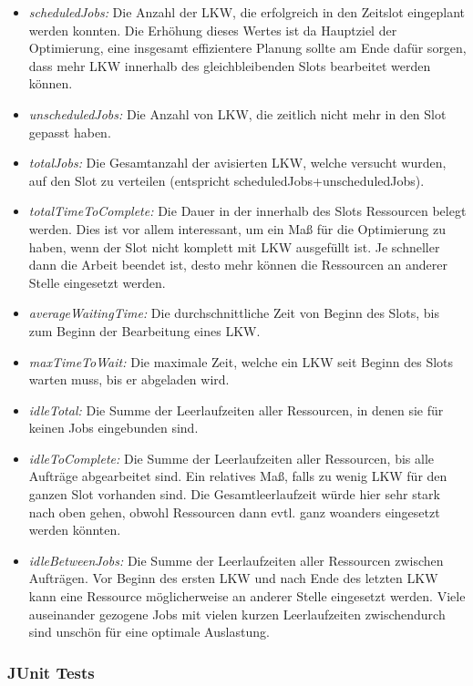 \begin{itemize}
    \item \textit{scheduledJobs:} Die Anzahl der LKW, die erfolgreich in den Zeitslot eingeplant werden konnten. Die Erhöhung dieses Wertes ist da Hauptziel der Optimierung, eine insgesamt effizientere Planung sollte am Ende dafür sorgen, dass mehr LKW innerhalb des gleichbleibenden Slots bearbeitet werden können.
    \item \textit{unscheduledJobs:} Die Anzahl von LKW, die zeitlich nicht mehr in den Slot gepasst haben.
    \item \textit{totalJobs:} Die Gesamtanzahl der avisierten LKW, welche versucht wurden, auf den Slot zu verteilen (entspricht scheduledJobs+unscheduledJobs).
    \item \textit{totalTimeToComplete:} Die Dauer in der innerhalb des Slots Ressourcen belegt werden. Dies ist vor allem interessant, um ein Maß für die Optimierung zu haben, wenn der Slot nicht komplett mit LKW ausgefüllt ist. Je schneller dann die Arbeit beendet ist, desto mehr können die Ressourcen an anderer Stelle eingesetzt werden.
    \item \textit{averageWaitingTime:} Die durchschnittliche Zeit von Beginn des Slots, bis zum Beginn der Bearbeitung eines LKW. 
    \item \textit{maxTimeToWait:} Die maximale Zeit, welche ein LKW seit Beginn des Slots warten muss, bis er abgeladen wird.
    \item \textit{idleTotal:} Die Summe der Leerlaufzeiten aller Ressourcen, in denen sie für keinen Jobs eingebunden sind.
    \item \textit{idleToComplete:} Die Summe der Leerlaufzeiten aller Ressourcen, bis alle Aufträge abgearbeitet sind. Ein relatives Maß, falls zu wenig LKW für den ganzen Slot vorhanden sind. Die Gesamtleerlaufzeit würde hier sehr stark nach oben gehen, obwohl Ressourcen dann evtl. ganz woanders eingesetzt werden könnten.
    \item \textit{idleBetweenJobs:} Die Summe der Leerlaufzeiten aller Ressourcen zwischen Aufträgen. Vor Beginn des ersten LKW und nach Ende des letzten LKW kann eine Ressource möglicherweise an anderer Stelle eingesetzt werden. Viele auseinander gezogene Jobs mit vielen kurzen Leerlaufzeiten zwischendurch sind unschön für eine optimale Auslastung.
\end{itemize}


\subsubsection{JUnit Tests}

